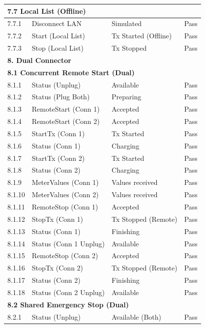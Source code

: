 \documentclass[a4paper,11pt]{report}
\begin{document}
\begin{footnotesize}
\begin{footnotesize}
\begin{longtable}{|p{1.0cm}|p{4.5cm}|p{6.5cm}|c|}
\multicolumn{4}{|l|}{\textbf{7.7 Local List (Offline)}} \\
\hline
7.7.1 & Disconnect LAN & Simulated & Pass \\
\hline
7.7.2 & Start (Local List) & Tx Started (Offline) & Pass \\
\hline
7.7.3 & Stop (Local List) & Tx Stopped & Pass \\
\hline

\multicolumn{4}{|l|}{\textbf{8. Dual Connector}} \\
\hline
\multicolumn{4}{|l|}{\textbf{8.1 Concurrent Remote Start (Dual)}} \\
\hline
8.1.1 & Status (Unplug) & Available & Pass \\
\hline
8.1.2 & Status (Plug Both) & Preparing & Pass \\
\hline
8.1.3 & RemoteStart (Conn 1) & Accepted & Pass \\
\hline
8.1.4 & RemoteStart (Conn 2) & Accepted & Pass \\
\hline
8.1.5 & StartTx (Conn 1) & Tx Started & Pass \\
\hline
8.1.6 & Status (Conn 1) & Charging & Pass \\
\hline
8.1.7 & StartTx (Conn 2) & Tx Started & Pass \\
\hline
8.1.8 & Status (Conn 2) & Charging & Pass \\
\hline
8.1.9 & MeterValues (Conn 1) & Values received & Pass \\
\hline
8.1.10 & MeterValues (Conn 2) & Values received & Pass \\
\hline
8.1.11 & RemoteStop (Conn 1) & Accepted & Pass \\
\hline
8.1.12 & StopTx (Conn 1) & Tx Stopped (Remote) & Pass \\
\hline
8.1.13 & Status (Conn 1) & Finishing & Pass \\
\hline
8.1.14 & Status (Conn 1 Unplug) & Available & Pass \\
\hline
8.1.15 & RemoteStop (Conn 2) & Accepted & Pass \\
\hline
8.1.16 & StopTx (Conn 2) & Tx Stopped (Remote) & Pass \\
\hline
8.1.17 & Status (Conn 2) & Finishing & Pass \\
\hline
8.1.18 & Status (Conn 2 Unplug) & Available & Pass \\
\hline
\multicolumn{4}{|l|}{\textbf{8.2 Shared Emergency Stop (Dual)}} \\
\hline
8.2.1 & Status (Unplug) & Available (Both) & Pass \\

\end{longtable}
\end{footnotesize}
\end{footnotesize}
\end{document}
